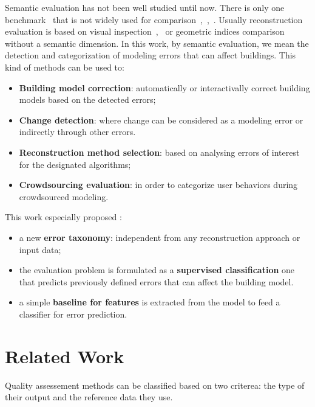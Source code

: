 \documentclass[runningheads]{llncs}
\begin{document}
	Semantic evaluation has not been well studied until now. There is only one benchmark~\cite{rottensteiner2014results} that is not widely used for comparison~\cite{Lafarge2012},~\cite{nguatem2017modeling},~\cite{li2016boxfitting}. Usually reconstruction evaluation is based on visual inspection~\cite{Musialski2012},~\cite{MacayMoreia2013} or geometric indices comparison~\cite{Kaartinen2005} without a semantic dimension. In this work, by semantic evaluation, we mean the detection and categorization of modeling errors that can affect buildings. This kind of methods can be used to:
	\begin{itemize}
		\item \textbf{Building model correction}: automatically or interactivally correct building models based on the detected errors;
		\item \textbf{Change detection}: where change can be considered as a modeling error or indirectly through other errors.
		\item \textbf{Reconstruction method selection}: based on analysing errors of interest for the designated algorithms;
		\item \textbf{Crowdsourcing evaluation}: in order to categorize user behaviors during crowdsourced modeling.
	\end{itemize}
	
	This work especially proposed :
	\begin{itemize}
		\item a new \textbf{error taxonomy}: independent from any reconstruction approach or input data;
		\item the evaluation problem is formulated as a \textbf{supervised classification} one that predicts previously defined errors that can affect the building model.
		\item a simple \textbf{baseline for features} is extracted from the model to feed a classifier for error prediction.
	\end{itemize}
\section{Related Work}

Quality assessement methods can be classified based on two criterea: the type of their output and the reference data they use.
\end{document}
